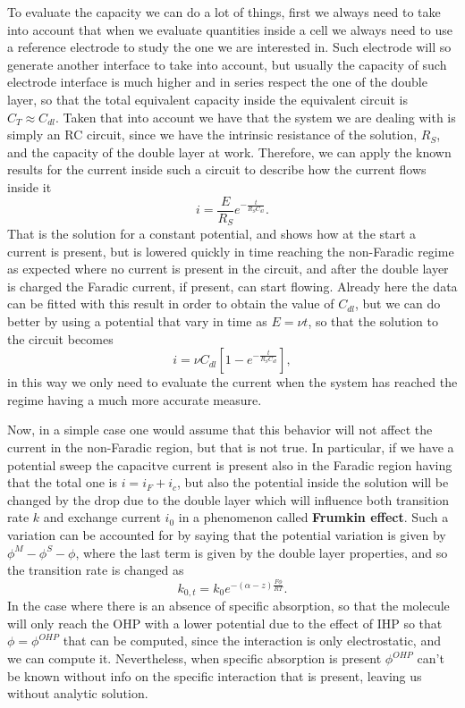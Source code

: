 To evaluate the capacity we can do a lot of things, first we always need to take into account that when we evaluate quantities inside a cell we always need to use a reference electrode to study the one we are interested in. Such electrode will so generate another interface to take into account, but usually the capacity of such electrode interface is much higher and in series respect the one of the double layer, so that the total equivalent capacity inside the equivalent circuit is $C_T \approx C_{dl}$. Taken that into account we have that the system we are dealing with is simply an RC circuit, since we have the intrinsic resistance of the solution, $R_S$, and the capacity of the double layer at work. Therefore, we can apply the known results for the current inside such a circuit to describe how the current flows inside it
\begin{equation}
    i = \frac{E}{R_S} e^{-\frac{t}{R_SC_{dl}}}.
\end{equation}
That is the solution for a constant potential, and shows how at the start a current is present, but is lowered quickly in time reaching the non-Faradic regime as expected where no current is present in the circuit, and after the double layer is charged the Faradic current, if present, can start flowing. Already here the data can be fitted with this result in order to obtain the value of $C_{dl}$, but we can do better by using a potential that vary in time as $E = \nu t$, so that the solution to the circuit becomes
\begin{equation}
    i = \nu C_{dl} \left[ 1 - e^{-\frac{t}{R_SC_{dl}}} \right],
\end{equation}
in this way we only need to evaluate the current when the system has reached the regime having a much more accurate measure.

Now, in a simple case one would assume that this behavior will not affect the current in the non-Faradic region, but that is not true. In particular, if we have a potential sweep the capacitve current is present also in the Faradic region having that the total one is $i = i_F + i_c$, but also the potential inside the solution will be changed by the drop due to the double layer which will influence both transition rate $k$ and exchange current $i_0$ in a phenomenon called \textbf{Frumkin effect}. Such a variation can be accounted for by saying that the potential variation is given by $\phi^M - \phi^S - \phi$, where the last term is given by the double layer properties, and so the transition rate is changed as
\begin{equation}
    k_{0,t} = k_0 e^{-(\alpha - z)\frac{F\phi}{RT}}.
\end{equation}
In the case where there is an absence of specific absorption, so that the molecule will only reach the OHP with a lower potential due to the effect of IHP so that $\phi = \phi^{OHP}$ that can be computed, since the interaction is only electrostatic, and we can compute it. Nevertheless, when specific absorption is present $\phi^{OHP}$ can't be known without info on the specific interaction that is present, leaving us without analytic solution.

